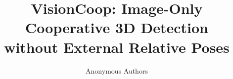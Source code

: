 \documentclass[letterpaper,10pt,conference]{ieeeconf}
\title{VisionCoop: Image-Only Cooperative 3D Detection\\without External Relative Poses}
\author{Anonymous Authors}
\begin{document}
\maketitle









\def\BIBdecl{\scriptsize}
\balance


\end{document}
